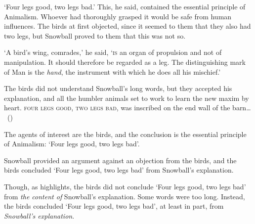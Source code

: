 \begin{note}
  \begin{scenario}[Animalism]
    \label{scen:animalism}
    `Four legs good, two legs bad.'
    This, he said, contained the essential principle of Animalism.
    Whoever had thoroughly grasped it would be safe from human influences.
    The birds at first objected, since it seemed to them that they also had two legs, but Snowball proved to them that this was not so.

    `A bird's wing, comrades,' he said, `\textsc{is} an organ of propulsion and not of manipulation.
    It should therefore be regarded as a leg.
    The distinguishing mark of Man is the \emph{hand}, the instrument with which he does all his mischief.'

    The birds did not understand Snowball's long words, but they accepted his explanation, and all the humbler animals set to work to learn the new maxim by heart.
    \textsc{four legs good, two legs bad}, was inscribed on the end wall of the barn\dots%
    \mbox{ }\hfill\mbox{(\cite[25]{Orwell:1976aa})}%
    \newline
  \end{scenario}

  The agents of interest are the birds, and the conclusion is the essential principle of Animalism:
  `Four legs good, two legs bad'.

  Snowball provided an argument against an objection from the birds, and the birds concluded `Four legs good, two legs bad' from Snowball's explanation.

  Though, as \citeauthor{Orwell:1976aa} highlights, the birds did not conclude `Four legs good, two legs bad' from \emph{the content of} Snowball's explanation.
  Some words were too long.
  Instead, the birds concluded `Four legs good, two legs bad', at least in part, from \emph{Snowball's explanation}.
\end{note}

